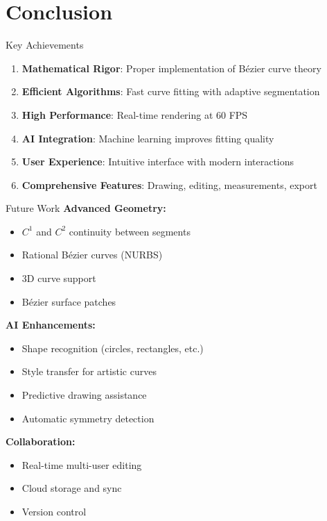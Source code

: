 \documentclass{beamer}
\begin{document}
\section{Conclusion}

\begin{frame}{Key Achievements}
\begin{enumerate}
    \item \textbf{Mathematical Rigor}: Proper implementation of Bézier curve theory
    
    \item \textbf{Efficient Algorithms}: Fast curve fitting with adaptive segmentation
    
    \item \textbf{High Performance}: Real-time rendering at 60 FPS
    
    \item \textbf{AI Integration}: Machine learning improves fitting quality
    
    \item \textbf{User Experience}: Intuitive interface with modern interactions
    
    \item \textbf{Comprehensive Features}: Drawing, editing, measurements, export
\end{enumerate}
\end{frame}

\begin{frame}{Future Work}
\textbf{Advanced Geometry:}
\begin{itemize}
    \item $C^1$ and $C^2$ continuity between segments
    \item Rational Bézier curves (NURBS)
    \item 3D curve support
    \item Bézier surface patches
\end{itemize}

\vspace{1em}

\textbf{AI Enhancements:}
\begin{itemize}
    \item Shape recognition (circles, rectangles, etc.)
    \item Style transfer for artistic curves
    \item Predictive drawing assistance
    \item Automatic symmetry detection
\end{itemize}

\vspace{1em}

\textbf{Collaboration:}
\begin{itemize}
    \item Real-time multi-user editing
    \item Cloud storage and sync
    \item Version control
\end{itemize}
\end{frame}
\end{document}
